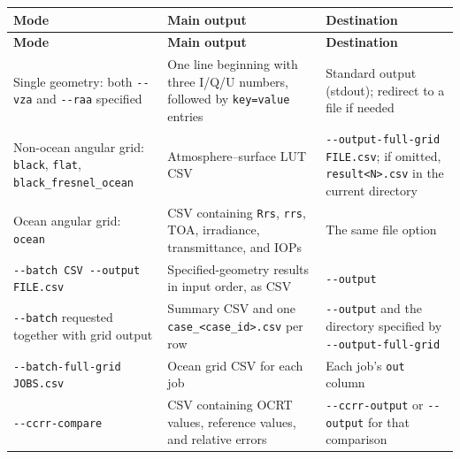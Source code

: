 {\TableFont
\begin{longtable}{@{}>{\raggedright\arraybackslash}p{}>{\raggedright\arraybackslash}p{}>{\raggedright\arraybackslash}p{}@{}}
\toprule
\textbf{Mode} & \textbf{Main output} & \textbf{Destination} \\
\midrule
\endfirsthead
\toprule
\textbf{Mode} & \textbf{Main output} & \textbf{Destination} \\
\midrule
\endhead
\bottomrule
\endfoot
Single geometry: both \texttt{-\allowbreak{}-\allowbreak{}vza} and \texttt{-\allowbreak{}-\allowbreak{}raa} specified & One line beginning with three I/Q/U numbers, followed by \texttt{key=\allowbreak{}value} entries & Standard output (stdout); redirect to a file if needed \\
Non-ocean angular grid: \texttt{black}, \texttt{flat}, \texttt{black\_\allowbreak{}fresnel\_\allowbreak{}ocean} & Atmosphere--surface LUT CSV & \texttt{-\allowbreak{}-\allowbreak{}output-\allowbreak{}full-\allowbreak{}grid FILE.\allowbreak{}csv}; if omitted, \texttt{result<N>.\allowbreak{}csv} in the current directory \\
Ocean angular grid: \texttt{ocean} & CSV containing \texttt{Rrs}, \texttt{rrs}, TOA, irradiance, transmittance, and IOPs & The same file option \\
\texttt{-\allowbreak{}-\allowbreak{}batch CSV -\allowbreak{}-\allowbreak{}output FILE.\allowbreak{}csv} & Specified-geometry results in input order, as CSV & \texttt{-\allowbreak{}-\allowbreak{}output} \\
\texttt{-\allowbreak{}-\allowbreak{}batch} requested together with grid output & Summary CSV and one \texttt{case\_\allowbreak{}<case\_\allowbreak{}id>.\allowbreak{}csv} per row & \texttt{-\allowbreak{}-\allowbreak{}output} and the directory specified by \texttt{-\allowbreak{}-\allowbreak{}output-\allowbreak{}full-\allowbreak{}grid} \\
\texttt{-\allowbreak{}-\allowbreak{}batch-\allowbreak{}full-\allowbreak{}grid JOBS.\allowbreak{}csv} & Ocean grid CSV for each job & Each job's \texttt{out} column \\
\texttt{-\allowbreak{}-\allowbreak{}ccrr-\allowbreak{}compare} & CSV containing OCRT values, reference values, and relative errors & \texttt{-\allowbreak{}-\allowbreak{}ccrr-\allowbreak{}output} or \texttt{-\allowbreak{}-\allowbreak{}output} for that comparison \\
\end{longtable}
}

